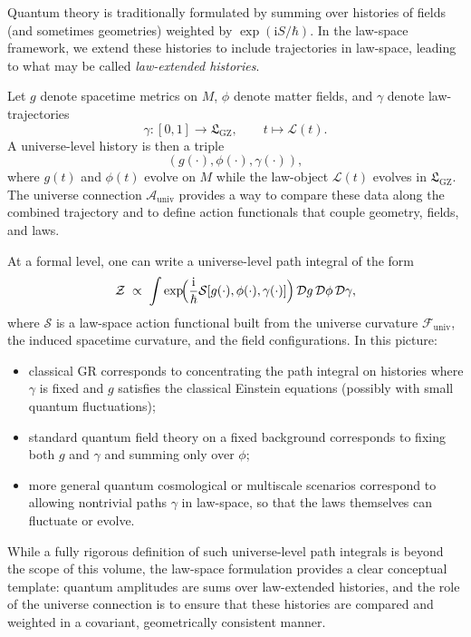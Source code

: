 \documentclass[11pt]{book}
\newcommand{\GZLS}{\ensuremath{\mathfrak{L}_{\mathrm{GZ}}}}
\newcommand{\Base}{\ensuremath{M}}
\theoremstyle{plain}
\theoremstyle{definition}
\theoremstyle{remark}
\begin{document}
Quantum theory is traditionally formulated by summing over histories
of fields (and sometimes geometries) weighted by
$\exp(\mathrm{i}S/\hbar)$. In the law-space framework, we extend
these histories to include trajectories in law-space, leading to
what may be called \emph{law-extended histories}.

Let $g$ denote spacetime metrics on $\Base$, $\phi$ denote matter
fields, and $\gamma$ denote law-trajectories
\[
   \gamma \colon [0,1] \longrightarrow \GZLS,
   \qquad t \longmapsto \mathcal{L}(t).
\]
A universe-level history is then a triple
\[
   (g(\cdot), \phi(\cdot), \gamma(\cdot)),
\]
where $g(t)$ and $\phi(t)$ evolve on $\Base$ while the law-object
$\mathcal{L}(t)$ evolves in $\GZLS$. The universe connection
$\mathcal{A}_{\mathrm{univ}}$ provides a way to compare these data
along the combined trajectory and to define action functionals that
couple geometry, fields, and laws.

At a formal level, one can write a universe-level path integral of
the form
\[
   \mathcal{Z}
   \;\propto\;
   \int
   \exp\!\Bigl(\frac{\mathrm{i}}{\hbar}
   \mathcal{S}[g(\cdot),\phi(\cdot),\gamma(\cdot)]\Bigr)\,
   \mathcal{D}g\,\mathcal{D}\phi\,\mathcal{D}\gamma,
\]
where $\mathcal{S}$ is a law-space action functional built from the
universe curvature $\mathcal{F}_{\mathrm{univ}}$, the induced
spacetime curvature, and the field configurations. In this picture:

\begin{itemize}
  \item classical GR corresponds to concentrating the path integral
        on histories where $\gamma$ is fixed and $g$ satisfies the
        classical Einstein equations (possibly with small quantum
        fluctuations);
  \item standard quantum field theory on a fixed background
        corresponds to fixing both $g$ and $\gamma$ and summing
        only over $\phi$;
  \item more general quantum cosmological or multiscale scenarios
        correspond to allowing nontrivial paths $\gamma$ in law-space,
        so that the laws themselves can fluctuate or evolve.
\end{itemize}

While a fully rigorous definition of such universe-level path
integrals is beyond the scope of this volume, the law-space
formulation provides a clear conceptual template: quantum amplitudes
are sums over law-extended histories, and the role of the universe
connection is to ensure that these histories are compared and
weighted in a covariant, geometrically consistent manner.
\end{document}
